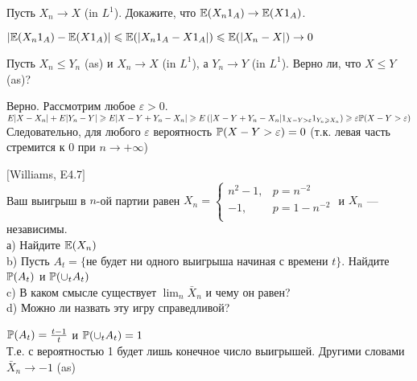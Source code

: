 \begin{problem}
Пусть $X_{n}\rightarrow X$ (in $L^{1}$). Докажите, что
$\E(X_{n}1_{A})\rightarrow \E(X 1_{A})$.

\begin{sol}

$|\E(X_{n}1_{A})-\E(X 1_{A})|\le \E(|X_{n}1_{A}-X 1_{A}|)\le
\E(|X_{n}-X|)\rightarrow 0$
\end{sol}
\end{problem}

\begin{problem}
Пусть $X_{n}\le Y_{n}$ (as) и $X_{n}\rightarrow X$ (in $L^{1}$), а
$Y_{n}\rightarrow Y$ (in $L^{1}$). Верно ли, что $X\le Y$ (as)?

\begin{sol}

Верно. Рассмотрим любое $\varepsilon>0$. \\
$E|X-X_{n}|+E|Y_{n}-Y|\ge E|X-Y+Y_{n}-X_{n}|\ge E\left(
|X-Y+Y_{n}-X_{n}| 1_{X-Y>\varepsilon}1_{Y_{n}\ge X_{n}}\right)\ge
\varepsilon \P(X-Y>\varepsilon)$ \\
Следовательно, для любого $\varepsilon$ вероятность
$\P(X-Y>\varepsilon)=0$ (т.к. левая часть стремится к 0 при
$n\rightarrow +\infty$)
\end{sol}
\end{problem}

\begin{problem}
$[$Williams, E4.7$]$ \\
Ваш выигрыш в $n$-ой партии равен $X_{n}=
\begin{cases}
  n^{2}-1, & p=n^{-2} \\
  -1, & p=1-n^{-2} \\
\end{cases}$ и $X_{n}$ — независимы. \\
а) Найдите $\E(X_{n})$ \\
b) Пусть $A_{t}=\{$не будет ни одного выигрыша начиная с времени
$t\}$. Найдите $\P(A_{t})$ и $\P(\cup_{t} A_{t})$ \\
c) В каком смысле существует $\lim_{n}\bar{X}_{n}$ и чему он
равен? \\
d) Можно ли назвать эту игру справедливой?

\begin{sol}


$\P(A_{t})=\frac{t-1}{t}$ и $\P(\cup_{t} A_{t})=1$ \\
Т.е. с вероятностью 1 будет лишь конечное число выигрышей. Другими
словами $\bar{X}_{n} \rightarrow -1$ (as)
\end{sol}
\end{problem}

